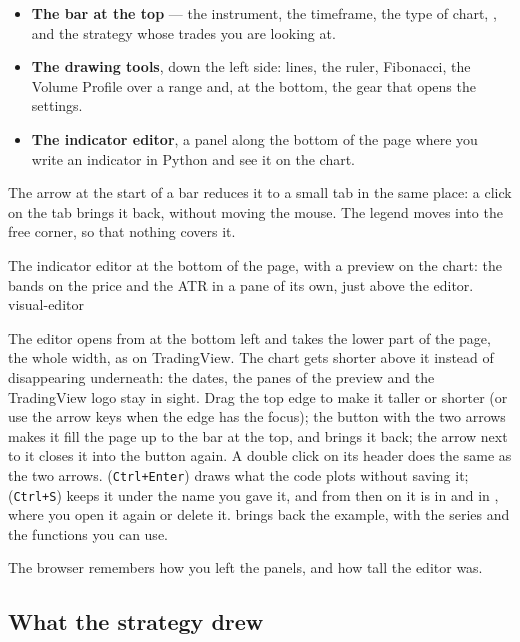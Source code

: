 \begin{itemize}
  \item \textbf{The bar at the top} --- the instrument, the timeframe, the
    type of chart, ,  and the strategy whose
    trades you are looking at.
  \item \textbf{The drawing tools}, down the left side: lines, the ruler,
    Fibonacci, the Volume Profile over a range and, at the bottom, the gear
    that opens the settings.
  \item \textbf{The indicator editor}, a panel along the bottom of the page
    where you write an indicator in Python and see it on the chart.
\end{itemize}

\noindent
The arrow at the start of a bar reduces it to a small tab in the same
place: a click on the tab brings it back, without moving the mouse. The
legend moves into the free corner, so that nothing covers it.

  {The indicator editor at the bottom of the page, with a preview on the
   chart: the bands on the price and the ATR in a pane of its own, just above
   the editor.}
  {visual-editor}

\noindent
The editor opens from  at the bottom left and
takes the lower part of the page, the whole width, as on TradingView. The
chart gets shorter above it instead of disappearing underneath: the dates,
the panes of the preview and the TradingView logo stay in sight. Drag the
top edge to make it taller or shorter (or use the arrow keys when the edge
has the focus); the button with the two arrows makes it fill the page up to
the bar at the top, and brings it back; the arrow next to it closes it into
the button again. A double click on its header does the same as the two
arrows. 
(\texttt{Ctrl+Enter}) draws what the code plots without saving it;
 (\texttt{Ctrl+S}) keeps it under the name you gave it, and
from then on it is in  and in , where
you open it again or delete it.  brings back the
example, with the series and the functions you can use.

\noindent
The browser remembers how you left the panels, and how tall the editor was.

\subsection{What the strategy drew}\label{sez:view-plots}

